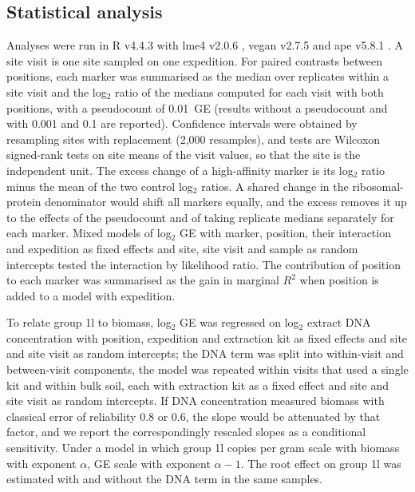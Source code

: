 \subsection*{Statistical analysis}
Analyses were run in R v4.4.3 with lme4 v2.0.6 \citep{bates2015lme4}, vegan v2.7.5
\citep{oksanen2025vegan} and ape v5.8.1 \citep{paradis2019ape}. A site visit is one site sampled on one
expedition. For paired contrasts between positions, each marker was summarised as the median over
replicates within a site visit and the log$_2$ ratio of the medians computed for each visit with both
positions, with a pseudocount of 0.01~GE (results without a pseudocount and with 0.001 and 0.1 are
reported). Confidence intervals were obtained by resampling sites with replacement (2{,}000 resamples), and
tests are Wilcoxon signed-rank tests on site means of the visit values, so that the site is the
independent unit. The excess change of a high-affinity marker is its log$_2$ ratio minus the mean of the
two control log$_2$ ratios. A shared change in the ribosomal-protein denominator would shift all markers
equally, and the excess removes it up to the effects of the pseudocount and of taking replicate medians
separately for each marker. Mixed models of log$_2$ GE with marker, position, their interaction and
expedition as fixed effects and site, site visit and sample as random intercepts tested the interaction
by likelihood ratio. The contribution of position to each marker was summarised as the gain in marginal
$R^2$ when position is added to a model with expedition.

To relate group 1l to biomass, log$_2$ GE was regressed on log$_2$ extract DNA concentration with position,
expedition and extraction kit as fixed effects and site and site visit as random intercepts; the DNA term
was split into within-visit and between-visit components, the model was repeated within visits that used a
single kit and within bulk soil, each with extraction kit as a fixed effect and site and site visit as
random intercepts. If DNA concentration measured biomass with classical error of reliability 0.8 or 0.6,
the slope would be attenuated by that factor, and we report the correspondingly rescaled slopes as a
conditional sensitivity. Under a model in which group 1l copies per gram scale with biomass with exponent
$\alpha$, GE scale with exponent $\alpha-1$. The root effect on group 1l was estimated with and without the
DNA term in the same samples.

